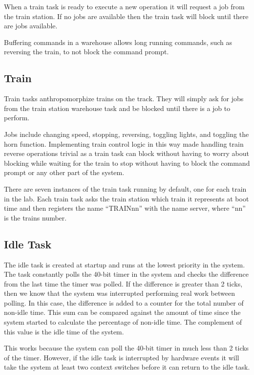 \documentclass[pdftex,10pt,a4paper]{article}
\begin{document}
When a train task is ready to execute a new operation it will request
a job from the train station. If no jobs are available then the train
task will block until there are jobs available.

Buffering commands in a warehouse allows long running commands, such
as reversing the train, to not block the command prompt.


\subsection*{Train}

Train tasks anthropomorphize trains on the track. They will simply ask
for jobs from the train station warehouse task and be blocked until
there is a job to perform.

Jobs include changing speed, stopping, reversing, toggling lights, and
toggling the horn function. Implementing train control logic in this
way made handling train reverse operations trivial as a train task can
block without having to worry about blocking while waiting for the
train to stop without having to block the command prompt or any
other part of the system.

There are seven instances of the train task running by default, one
for each train in the lab. Each train task asks the train station
which train it represents at boot time and then registers the
name ``TRAINnn'' with the name server, where ``nn'' is the trains
number.

\subsection*{Idle Task}

The idle task is created at startup and runs at the lowest priority in
the system. The task constantly polls the 40-bit timer in the system
and checks the difference from the last time the timer was polled. If
the difference is greater than 2 ticks, then we know that the system
was interrupted performing real work between polling. In this case,
the difference is added to a counter for the total number of non-idle
time. This sum can be compared against the amount of time since the
system started to calculate the percentage of non-idle time. The
complement of this value is the idle time of the system.

This works because the system can poll the 40-bit timer in much less
than 2 ticks of the timer. However, if the idle task is interrupted by
hardware events it will take the system at least two context switches
before it can return to the idle task.
\end{document}
